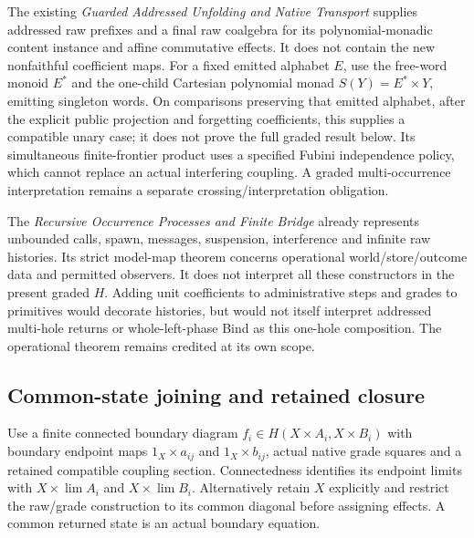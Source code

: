 \documentclass[11pt]{article}
\begin{document}
The existing \emph{Guarded Addressed Unfolding and Native Transport} supplies addressed raw prefixes and a final raw coalgebra for its polynomial-monadic content instance and affine commutative effects. It does not contain the new nonfaithful coefficient maps. For a fixed emitted alphabet $E$, use the free-word monoid $E^*$ and the one-child Cartesian polynomial monad $S(Y)=E^*\times Y$, emitting singleton words. On comparisons preserving that emitted alphabet, after the explicit public projection and forgetting coefficients, this supplies a compatible unary case; it does not prove the full graded result below. Its simultaneous finite-frontier product uses a specified Fubini independence policy, which cannot replace an actual interfering coupling. A graded multi-occurrence interpretation remains a separate crossing/interpretation obligation.

The \emph{Recursive Occurrence Processes and Finite Bridge} already represents unbounded calls, spawn, messages, suspension, interference and infinite raw histories. Its strict model-map theorem concerns operational world/store/outcome data and permitted observers. It does not interpret all these constructors in the present graded $H$. Adding unit coefficients to administrative steps and grades to primitives would decorate histories, but would not itself interpret addressed multi-hole returns or whole-left-phase Bind as this one-hole composition. The operational theorem remains credited at its own scope.

\subsection{Common-state joining and retained closure}

Use a finite connected boundary diagram $f_i\in H(X\times A_i,X\times B_i)$ with boundary endpoint maps $1_X\times a_{ij}$ and $1_X\times b_{ij}$, actual native grade squares and a retained compatible coupling section. Connectedness identifies its endpoint limits with $X\times\lim A_i$ and $X\times\lim B_i$. Alternatively retain $X$ explicitly and restrict the raw/grade construction to its common diagonal before assigning effects. A common returned state is an actual boundary equation.
\end{document}
